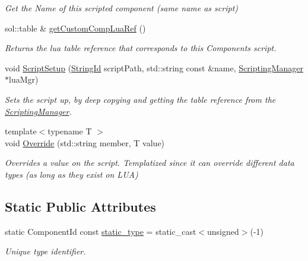 \begin{DoxyCompactItemize}
\begin{DoxyCompactList}\small\item\em Get the Name of this scripted component (same name as script) \end{DoxyCompactList}\item 
sol\+::table \& \hyperlink{classCustomComponent_a5d59a3fcc75fbe18c2d2ab9d1fe76576}{get\+Custom\+Comp\+Lua\+Ref} ()
\begin{DoxyCompactList}\small\item\em Returns the lua table reference that corresponds to this Component\textquotesingle{}s script. \end{DoxyCompactList}\item 
void \hyperlink{classCustomComponent_ac540fc607bb502790276815b55890c98}{Script\+Setup} (\hyperlink{classStringId}{String\+Id} script\+Path, std\+::string const \&name, \hyperlink{classScriptingManager}{Scripting\+Manager} $\ast$lua\+Mgr)
\begin{DoxyCompactList}\small\item\em Sets the script up, by deep copying and getting the table reference from the \hyperlink{classScriptingManager}{Scripting\+Manager}. \end{DoxyCompactList}\item 
{\footnotesize template$<$typename T $>$ }\\void \hyperlink{classCustomComponent_ab3107db0a720c77d00f9b73060cbcef3}{Override} (std\+::string member, T value)
\begin{DoxyCompactList}\small\item\em Overrides a value on the script. Templatized since it can override different data types (as long as they exist on L\+UA) \end{DoxyCompactList}\end{DoxyCompactItemize}
\subsection*{Static Public Attributes}
\begin{DoxyCompactItemize}
\item 
\mbox{\label{classCustomComponent_ae490cb396ab9ececc0a619a323929bfc}} 
static Component\+Id const \hyperlink{classCustomComponent_ae490cb396ab9ececc0a619a323929bfc}{static\+\_\+type} = static\+\_\+cast$<$unsigned$>$(-\/1)
\begin{DoxyCompactList}\small\item\em Unique type identifier. \end{DoxyCompactList}\end{DoxyCompactItemize}
